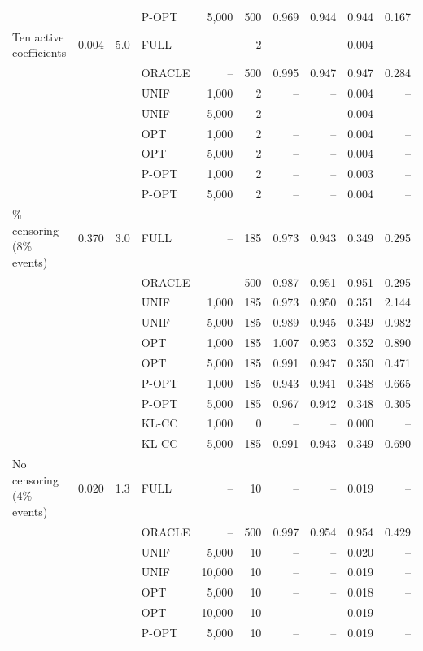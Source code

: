 \begin{tabular}{lrrlrrrrrr}
 &  &  & P-OPT & 5,000 & 500 & 0.969 & 0.944 & 0.944 & 0.167\\
\addlinespace
Ten active coefficients & 0.004 & 5.0 & FULL & -- & 2 & -- & -- & 0.004 & --\\
 &  &  & ORACLE & -- & 500 & 0.995 & 0.947 & 0.947 & 0.284\\
 &  &  & UNIF & 1,000 & 2 & -- & -- & 0.004 & --\\
 &  &  & UNIF & 5,000 & 2 & -- & -- & 0.004 & --\\
 &  &  & OPT & 1,000 & 2 & -- & -- & 0.004 & --\\
 &  &  & OPT & 5,000 & 2 & -- & -- & 0.004 & --\\
 &  &  & P-OPT & 1,000 & 2 & -- & -- & 0.003 & --\\
 &  &  & P-OPT & 5,000 & 2 & -- & -- & 0.004 & --\\
\addlinespace
90\% censoring (8\% events) & 0.370 & 3.0 & FULL & -- & 185 & 0.973 & 0.943 & 0.349 & 0.295\\
 &  &  & ORACLE & -- & 500 & 0.987 & 0.951 & 0.951 & 0.295\\
 &  &  & UNIF & 1,000 & 185 & 0.973 & 0.950 & 0.351 & 2.144\\
 &  &  & UNIF & 5,000 & 185 & 0.989 & 0.945 & 0.349 & 0.982\\
 &  &  & OPT & 1,000 & 185 & 1.007 & 0.953 & 0.352 & 0.890\\
 &  &  & OPT & 5,000 & 185 & 0.991 & 0.947 & 0.350 & 0.471\\
 &  &  & P-OPT & 1,000 & 185 & 0.943 & 0.941 & 0.348 & 0.665\\
 &  &  & P-OPT & 5,000 & 185 & 0.967 & 0.942 & 0.348 & 0.305\\
 &  &  & KL-CC & 1,000 & 0 & -- & -- & 0.000 & --\\
 &  &  & KL-CC & 5,000 & 185 & 0.991 & 0.943 & 0.349 & 0.690\\
\addlinespace
No censoring (4\% events) & 0.020 & 1.3 & FULL & -- & 10 & -- & -- & 0.019 & --\\
 &  &  & ORACLE & -- & 500 & 0.997 & 0.954 & 0.954 & 0.429\\
 &  &  & UNIF & 5,000 & 10 & -- & -- & 0.020 & --\\
 &  &  & UNIF & 10,000 & 10 & -- & -- & 0.019 & --\\
 &  &  & OPT & 5,000 & 10 & -- & -- & 0.018 & --\\
 &  &  & OPT & 10,000 & 10 & -- & -- & 0.019 & --\\
 &  &  & P-OPT & 5,000 & 10 & -- & -- & 0.019 & --\\

\end{tabular}
